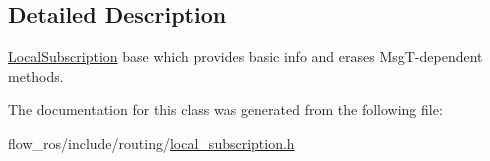 \subsection{Detailed Description}
\hyperlink{classflow__ros_1_1routing_1_1_local_subscription}{Local\+Subscription} base which provides basic info and erases Msg\+T-\/dependent methods. 

The documentation for this class was generated from the following file\+:\begin{DoxyCompactItemize}
\item 
flow\+\_\+ros/include/routing/\hyperlink{local__subscription_8h}{local\+\_\+subscription.\+h}\end{DoxyCompactItemize}
